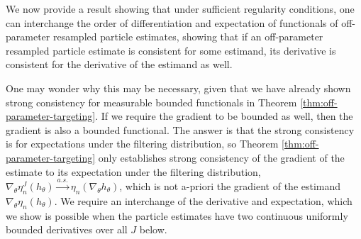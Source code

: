
We now provide a result showing that under sufficient regularity conditions, one can interchange the order of differentiation and expectation of functionals of off-parameter resampled particle estimates, showing that if an off-parameter resampled particle estimate is consistent for some estimand, its derivative is consistent for the derivative of the estimand as well.

One may wonder why this may be necessary, given that we have already shown strong consistency for measurable bounded functionals in Theorem \ref{thm:off-parameter-targeting}. If we require the gradient to be bounded as well, then the gradient is also a bounded functional. The answer is that the strong consistency is for expectations under the filtering distribution, so Theorem \ref{thm:off-parameter-targeting} only establishes strong consistency of the gradient of the estimate to its expectation under the filtering distribution, $\nabla_\theta \eta_n^J(h_\theta)  \stackrel{a.s.}{\to} \eta_n(\nabla_\theta h_\theta)$, which is not a-priori the gradient of the estimand $\nabla_\theta \eta_n(h_\theta)$. We require an interchange of the derivative and expectation, which we show is possible when the particle estimates have two continuous uniformly bounded derivatives over all $J$ below.


